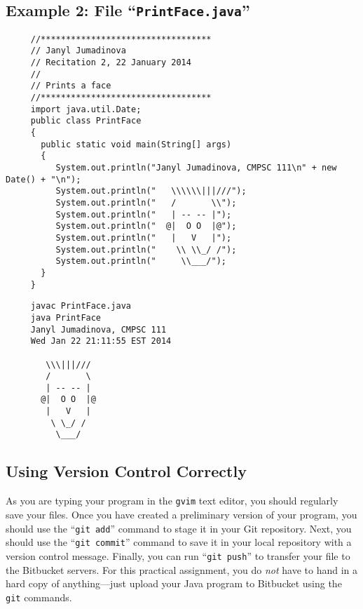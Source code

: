 \subsection*{Example 2: File ``{\tt PrintFace.java}''}
\begin{verbatim}
     //**********************************
     // Janyl Jumadinova
     // Recitation 2, 22 January 2014
     //
     // Prints a face
     //**********************************
     import java.util.Date;
     public class PrintFace
     {
       public static void main(String[] args)
       {
          System.out.println("Janyl Jumadinova, CMPSC 111\n" + new Date() + "\n");
          System.out.println("   \\\\\\|||///");
          System.out.println("   /       \\");
          System.out.println("   | -- -- |");
          System.out.println("  @|  O O  |@");
          System.out.println("   |   V   |");
          System.out.println("    \\ \\_/ /");
          System.out.println("     \\___/");
       }
     } 
\end{verbatim}
\begin{verbatim}
     javac PrintFace.java
     java PrintFace
     Janyl Jumadinova, CMPSC 111
     Wed Jan 22 21:11:55 EST 2014
     
        \\\|||///
        /       \
        | -- -- |
       @|  O O  |@
        |   V   |
         \ \_/ /
          \___/
\end{verbatim}

\newpage
\subsection*{Using Version Control Correctly}

As you are typing your program in the {\tt gvim} text editor, you should regularly save your files.  Once you have
created a preliminary version of your program, you should use the ``{\tt git add}'' command to stage it in your Git
repository.  Next, you should use the ``{\tt git commit}'' command to save it in your local repository with a version
control message.  Finally, you can run ``{\tt git push}'' to transfer your file to the Bitbucket servers.  For this
practical assignment, you do {\em not} have to hand in a hard copy of anything---just upload your Java program to
Bitbucket using the {\tt git} commands. 

